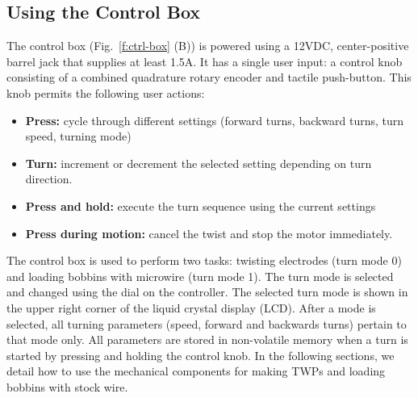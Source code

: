 \documentclass[11pt,a4paper]{article}
\begin{document}
\subsection{Using the Control Box}
The control box (Fig.~\ref{f:ctrl-box} (B)) is powered using a 12VDC,
center-positive barrel jack that supplies at least 1.5A. It has a single user
input: a control knob consisting of a combined quadrature rotary encoder and
tactile push-button. This knob permits the following user actions:

\begin{itemize}[noitemsep]
    \item \textbf{Press:} cycle through different settings (forward turns,
        backward turns, turn speed, turning mode)
    \item \textbf{Turn:} increment or decrement the selected setting
        depending on turn direction.
    \item \textbf{Press and hold:} execute the turn sequence using the
        current settings
    \item \textbf{Press during motion:} cancel the twist and stop the motor
        immediately.
\end{itemize}

The control box is used to perform two tasks: twisting electrodes (turn mode 0)
and loading bobbins with microwire (turn mode 1). The turn mode is selected and
changed using the dial on the controller. The selected turn mode is shown in
the upper right corner of the liquid crystal display (LCD). After a mode is
selected, all turning parameters (speed, forward and backwards turns) pertain
to that mode only. All parameters are stored in non-volatile memory when a turn
is started by pressing and holding the control knob. In the following sections,
we detail how to use the mechanical components for making TWPs and loading
bobbins with stock wire.
\end{document}
